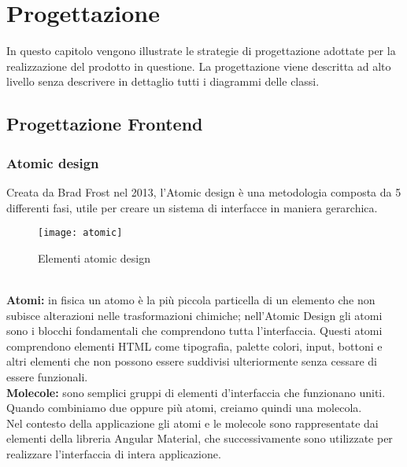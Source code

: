 
\chapter{Progettazione}
\label{cap:progettazione}
\label{sec:tecnologie-strumenti}

In questo capitolo vengono illustrate le strategie di progettazione adottate per la realizzazione del prodotto in questione. La progettazione viene descritta ad alto livello senza descrivere in dettaglio tutti i diagrammi delle classi. 

\section{Progettazione Frontend}
\label{sec:progettazione}

\subsection{Atomic design}
Creata da Brad Frost nel 2013, l'Atomic design è una metodologia composta da 5 differenti fasi, utile per creare un sistema di interfacce in maniera gerarchica.
\begin{figure}[!h] 
	\centering 
	\texttt{[image: atomic]} 
	\caption{Elementi atomic design}
\end{figure}
\\

\textbf{Atomi:} in fisica un atomo è la più piccola particella di un elemento che non subisce alterazioni nelle trasformazioni chimiche; nell’Atomic Design gli atomi sono i blocchi fondamentali che comprendono tutta l’interfaccia.
Questi atomi comprendono elementi HTML come tipografia, palette colori, input, bottoni e altri elementi che non possono essere suddivisi ulteriormente senza cessare di essere funzionali.
\\

\textbf{Molecole:} sono semplici gruppi di elementi d'interfaccia che funzionano uniti. Quando combiniamo due oppure più atomi, creiamo quindi una molecola.
\\

Nel contesto della applicazione gli atomi e le molecole sono rappresentate dai elementi della libreria Angular Material, che successivamente sono utilizzate per realizzare l'interfaccia di intera applicazione.

